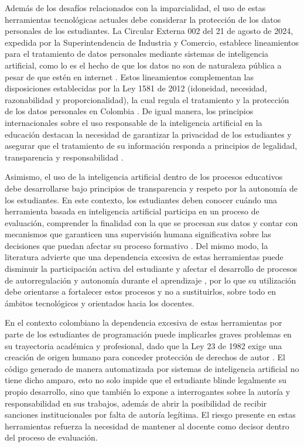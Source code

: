 \documentclass[letterpaper, 10 pt, conference]{ieeeconf}
\begin{document}
Además de los desafíos relacionados con la imparcialidad, el uso de estas herramientas tecnológicas actuales debe considerar la protección de los datos personales de los estudiantes. La Circular Externa 002 del 21 de agosto de 2024, expedida por la Superintendencia de Industria y Comercio, establece lineamientos para el tratamiento de datos personales mediante sistemas de inteligencia artificial, como lo es el hecho de que los datos no son de naturaleza pública a pesar de que estén en internet \cite{2}. Estos lineamientos complementan las disposiciones establecidas por la Ley 1581 de 2012 (idoneidad, necesidad, razonabilidad y proporcionalidad), la cual regula el tratamiento y la protección de los datos personales en Colombia \cite{3}. De igual manera, los principios internacionales sobre el uso responsable de la inteligencia artificial en la educación destacan la necesidad de garantizar la privacidad de los estudiantes y asegurar que el tratamiento de su información responda a principios de legalidad, transparencia y responsabilidad \cite{14}. 

Asimismo, el uso de la inteligencia artificial dentro de los procesos educativos debe desarrollarse bajo principios de transparencia y respeto por la autonomía de los estudiantes. En este contexto, los estudiantes deben conocer cuándo una herramienta basada en inteligencia artificial participa en un proceso de evaluación, comprender la finalidad con la que se procesan sus datos y contar con mecanismos que garanticen una supervisión humana significativa sobre las decisiones que puedan afectar su proceso formativo \cite{14}. Del mismo modo, la literatura advierte que una dependencia excesiva de estas herramientas puede disminuir la participación activa del estudiante y afectar el desarrollo de procesos de autorregulación y autonomía durante el aprendizaje \cite{15}, por lo que su utilización debe orientarse a fortalecer estos procesos y no a sustituirlos, sobre todo en ámbitos tecnológicos y orientados hacia los docentes.

En el contexto colombiano la dependencia excesiva de estas herramientas por parte de los estudiantes de programación puede implicarles graves problemas en su trayectoria académica y profesional, dado que la Ley 23 de 1982 exige una creación de origen humano para conceder protección de derechos de autor \cite{20}. El código generado de manera automatizada por sistemas de inteligencia artificial no tiene dicho amparo, esto no solo impide que el estudiante blinde legalmente su propio desarrollo, sino que también lo expone a interrogantes sobre la autoría y responsabilidad en sus trabajos, además de abrir la posibilidad de recibir sanciones institucionales por falta de autoría legítima. El riesgo presente en estas herramientas refuerza la necesidad de mantener al docente como decisor dentro del proceso de evaluación.
\end{document}
